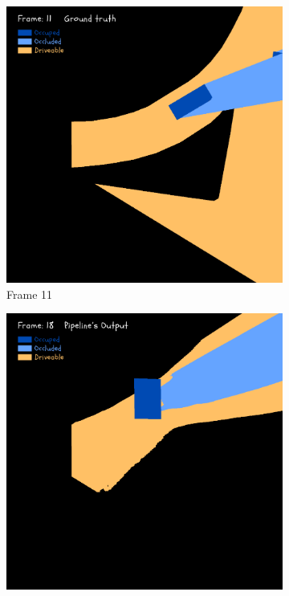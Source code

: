 \begin{figure}[htbp]
\begin{subfigure}[b]{0.19\linewidth}
        \vspace{0.5em} %
        \includegraphics[width=\linewidth]{images/experiments/occ2_masks/gt_occ_mask_colored_11.png}
        \caption{Frame 11}
        \label{subfig:occ_masks_frame11}
    \end{subfigure}
    \hfill
    \begin{subfigure}[b]{0.19\linewidth}
        \centering
        \includegraphics[width=\linewidth]{images/experiments/occ2_masks/dt_occ_mask_colored_18.png}

\end{subfigure}
\end{figure}

